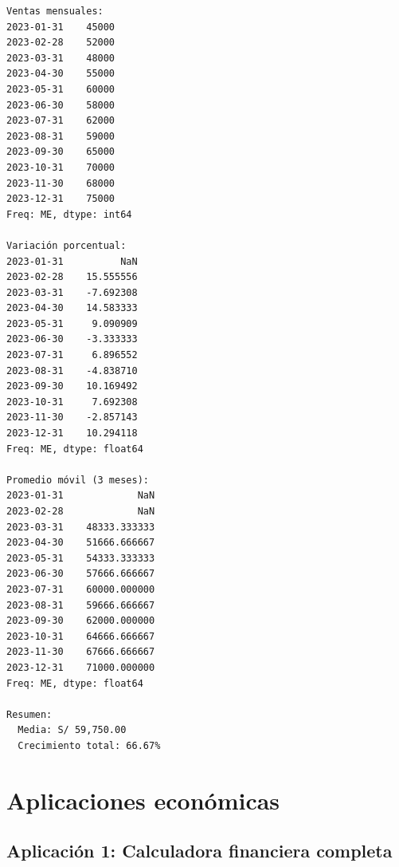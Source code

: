 \documentclass[
  doc,
  floatsintext,
  longtable,
  a4paper,
  nolmodern,
  notxfonts,
  notimes,
  12pt,
  colorlinks=true,linkcolor=blue,citecolor=blue,urlcolor=blue]{apa7}
\begin{document}
\begin{verbatim}
Ventas mensuales:
2023-01-31    45000
2023-02-28    52000
2023-03-31    48000
2023-04-30    55000
2023-05-31    60000
2023-06-30    58000
2023-07-31    62000
2023-08-31    59000
2023-09-30    65000
2023-10-31    70000
2023-11-30    68000
2023-12-31    75000
Freq: ME, dtype: int64

Variación porcentual:
2023-01-31          NaN
2023-02-28    15.555556
2023-03-31    -7.692308
2023-04-30    14.583333
2023-05-31     9.090909
2023-06-30    -3.333333
2023-07-31     6.896552
2023-08-31    -4.838710
2023-09-30    10.169492
2023-10-31     7.692308
2023-11-30    -2.857143
2023-12-31    10.294118
Freq: ME, dtype: float64

Promedio móvil (3 meses):
2023-01-31             NaN
2023-02-28             NaN
2023-03-31    48333.333333
2023-04-30    51666.666667
2023-05-31    54333.333333
2023-06-30    57666.666667
2023-07-31    60000.000000
2023-08-31    59666.666667
2023-09-30    62000.000000
2023-10-31    64666.666667
2023-11-30    67666.666667
2023-12-31    71000.000000
Freq: ME, dtype: float64

Resumen:
  Media: S/ 59,750.00
  Crecimiento total: 66.67%
\end{verbatim}

\section{Aplicaciones económicas}\label{aplicaciones-econuxf3micas-1}

\subsection{Aplicación 1: Calculadora financiera
completa}\label{aplicaciuxf3n-1-calculadora-financiera-completa}
\end{document}
